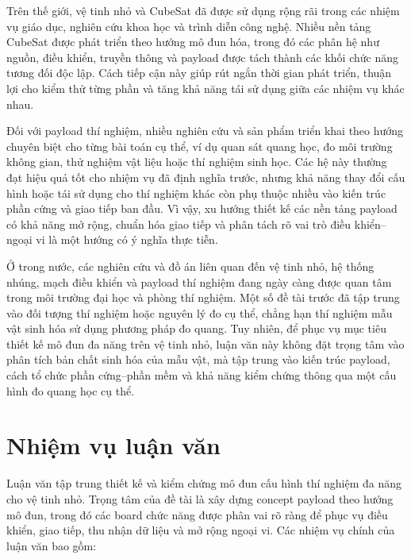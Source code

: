 Trên thế giới, vệ tinh nhỏ và CubeSat đã được sử dụng rộng rãi trong các nhiệm vụ giáo dục, nghiên cứu khoa học và trình diễn công nghệ. Nhiều nền tảng CubeSat được phát triển theo hướng mô đun hóa, trong đó các phân hệ như nguồn, điều khiển, truyền thông và payload được tách thành các khối chức năng tương đối độc lập. Cách tiếp cận này giúp rút ngắn thời gian phát triển, thuận lợi cho kiểm thử từng phần và tăng khả năng tái sử dụng giữa các nhiệm vụ khác nhau.

Đối với payload thí nghiệm, nhiều nghiên cứu và sản phẩm triển khai theo hướng chuyên biệt cho từng bài toán cụ thể, ví dụ quan sát quang học, đo môi trường không gian, thử nghiệm vật liệu hoặc thí nghiệm sinh học. Các hệ này thường đạt hiệu quả tốt cho nhiệm vụ đã định nghĩa trước, nhưng khả năng thay đổi cấu hình hoặc tái sử dụng cho thí nghiệm khác còn phụ thuộc nhiều vào kiến trúc phần cứng và giao tiếp ban đầu. Vì vậy, xu hướng thiết kế các nền tảng payload có khả năng mở rộng, chuẩn hóa giao tiếp và phân tách rõ vai trò điều khiển--ngoại vi là một hướng có ý nghĩa thực tiễn.

Ở trong nước, các nghiên cứu và đồ án liên quan đến vệ tinh nhỏ, hệ thống nhúng, mạch điều khiển và payload thí nghiệm đang ngày càng được quan tâm trong môi trường đại học và phòng thí nghiệm. Một số đề tài trước đã tập trung vào đối tượng thí nghiệm hoặc nguyên lý đo cụ thể, chẳng hạn thí nghiệm mẫu vật sinh hóa sử dụng phương pháp đo quang. Tuy nhiên, để phục vụ mục tiêu thiết kế mô đun đa năng trên vệ tinh nhỏ, luận văn này không đặt trọng tâm vào phân tích bản chất sinh hóa của mẫu vật, mà tập trung vào kiến trúc payload, cách tổ chức phần cứng--phần mềm và khả năng kiểm chứng thông qua một cấu hình đo quang học cụ thể.

\section{Nhiệm vụ luận văn}
\label{sec:nhiem_vu_luan_van}

Luận văn tập trung thiết kế và kiểm chứng mô đun cấu hình thí nghiệm đa năng cho vệ tinh nhỏ. Trọng tâm của đề tài là xây dựng concept payload theo hướng mô đun, trong đó các board chức năng được phân vai rõ ràng để phục vụ điều khiển, giao tiếp, thu nhận dữ liệu và mở rộng ngoại vi. Các nhiệm vụ chính của luận văn bao gồm:

